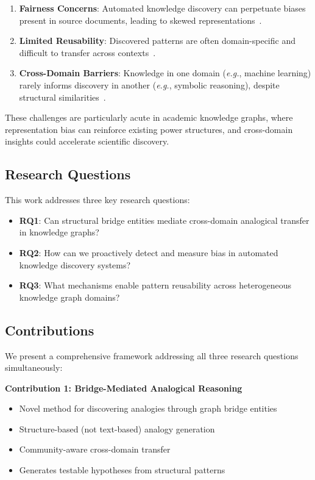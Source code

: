 \documentclass[11pt,twocolumn]{article}
\newcommand{\eg}{\emph{e.g.}}
\begin{document}
\begin{enumerate}
\item \textbf{Fairness Concerns}: Automated knowledge discovery can perpetuate biases present in source documents, leading to skewed representations~\cite{mehrabi2021survey,farber2018linked}.

\item \textbf{Limited Reusability}: Discovered patterns are often domain-specific and difficult to transfer across contexts~\cite{chen2022survey}.

\item \textbf{Cross-Domain Barriers}: Knowledge in one domain (\eg, machine learning) rarely informs discovery in another (\eg, symbolic reasoning), despite structural similarities~\cite{pan2010survey}.
\end{enumerate}

These challenges are particularly acute in academic knowledge graphs, where representation bias can reinforce existing power structures, and cross-domain insights could accelerate scientific discovery.

\subsection{Research Questions}

This work addresses three key research questions:

\begin{itemize}
\item \textbf{RQ1}: Can structural bridge entities mediate cross-domain analogical transfer in knowledge graphs?
\item \textbf{RQ2}: How can we proactively detect and measure bias in automated knowledge discovery systems?
\item \textbf{RQ3}: What mechanisms enable pattern reusability across heterogeneous knowledge graph domains?
\end{itemize}

\subsection{Contributions}

We present a comprehensive framework addressing all three research questions simultaneously:

\textbf{Contribution 1: Bridge-Mediated Analogical Reasoning}
\begin{itemize}
\item Novel method for discovering analogies through graph bridge entities
\item Structure-based (not text-based) analogy generation
\item Community-aware cross-domain transfer
\item Generates testable hypotheses from structural patterns
\end{itemize}
\end{document}
